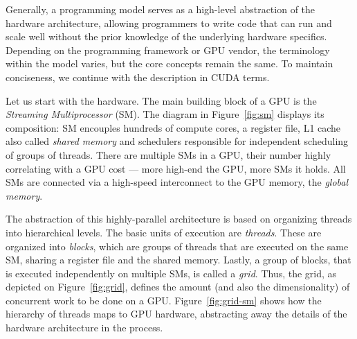 Generally, a programming model serves as a high-level abstraction of the hardware architecture, allowing programmers to write code that can run and scale well without the prior knowledge of the underlying hardware specifics. Depending on the programming framework or GPU vendor, the terminology within the model varies, but the core concepts remain the same. To maintain conciseness, we continue with the description in CUDA terms.

Let us start with the hardware. The main building block of a GPU is the \emph{Streaming Multiprocessor} (SM). The diagram in Figure~\ref{fig:sm} displays its composition: SM encouples hundreds of compute cores, a register file, L1 cache also called \emph{shared memory} and schedulers responsible for independent scheduling of groups of threads. There are multiple SMs in a GPU, their number highly correlating with a GPU cost --- more high-end the GPU, more SMs it holds. All SMs are connected via a high-speed interconnect to the GPU memory, the \emph{global memory}.

The abstraction of this highly-parallel architecture is based on organizing threads into hierarchical levels. The basic units of execution are \emph{threads}. These are organized into \emph{blocks}, which are groups of threads that are executed on the same SM, sharing a register file and the shared memory. Lastly, a group of blocks, that is executed independently on multiple SMs, is called a \emph{grid}. Thus, the grid, as depicted on Figure~\ref{fig:grid}, defines the amount (and also the dimensionality) of concurrent work to be done on a GPU. Figure~\ref{fig:grid-sm} shows how the hierarchy of threads maps to GPU hardware, abstracting away the details of the hardware architecture in the process.

